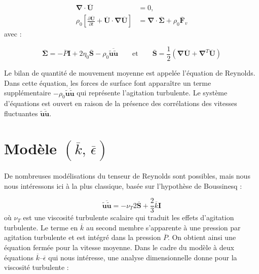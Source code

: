 \begin{align}
\boldsymbol{\nabla}\cdot\overline{\mathbf{U}} & =0,\label{eq:ContinuiteMasse_Moyennee}\\
\rho_{0}\left[\frac{\partial\overline{\mathbf{U}}}{\partial t}+\overline{\mathbf{U}}\cdot\boldsymbol{\nabla}\overline{\mathbf{U}}\right] & =\boldsymbol{\nabla}\cdot\overline{\boldsymbol{\Sigma}}+\rho_{0}\overline{\mathbf{F}}_{v}\label{eq:QDM_Moyennee}
\end{align}
avec :

\begin{equation}
\overline{\boldsymbol{\Sigma}}=-\overline{P}\mathbf{I}+2\eta_{0}\overline{\mathbf{S}}-\rho_{0}\overline{\tilde{\mathbf{u}}\tilde{\mathbf{u}}}\qquad\mbox{et}\qquad\overline{\mathbf{S}}=\frac{1}{2}(\boldsymbol{\nabla}\overline{\mathbf{U}}+\boldsymbol{\nabla}^{T}\overline{\mathbf{U}})\label{eq:TenseurReynolds}
\end{equation}


Le bilan de quantit\'e de mouvement moyenne est appel\'ee l'\'equation de
Reynolds. Dans cette \'equation, les forces de surface font appara\^itre
un terme suppl\'ementaire $-\rho_{0}\overline{\tilde{\mathbf{u}}\tilde{\mathbf{u}}}$
qui repr\'esente l'agitation turbulente. Le syst\`eme d'\'equations est
ouvert en raison de la pr\'esence des corr\'elations des vitesses fluctuantes
$\overline{\tilde{\mathbf{u}}\tilde{\mathbf{u}}}$.


\section{Mod\`ele $(\overline{k},\,\overline{\epsilon})$}

De nombreuses mod\'elisations du tenseur de Reynolds sont possibles,
mais nous nous int\'eressons ici \`a la plus classique, bas\'ee sur l\textquoteright hypoth\`ese
de Boussinesq : 

\begin{equation}
\overline{\tilde{\mathbf{u}}\tilde{\mathbf{u}}}=-\nu_{T}2\mathbf{\overline{S}}+\frac{2}{3}\overline{k}\mathbf{I}\label{eq:Hyp_Boussinesq}
\end{equation}
o\`u $\nu_{T}$ est une viscosit\'e turbulente scalaire qui traduit les
effets d\textquoteright agitation turbulente. Le terme en $\overline{k}$
au second membre s\textquoteright apparente \`a une pression par agitation
turbulente et est int\'egr\'e dans la pression $\overline{P}$. On obtient
ainsi une \'equation ferm\'ee pour la vitesse moyenne. Dans le cadre du
mod\`ele \`a deux \'equations $\overline{k}$--$\overline{\epsilon}$ qui
nous int\'eresse, une analyse dimensionnelle donne pour la viscosit\'e
turbulente :


